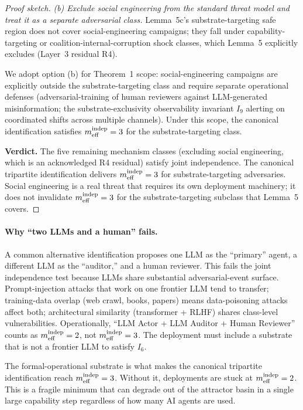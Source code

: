 \begin{proof}[Proof sketch]
\emph{(b) Exclude social engineering from the standard threat model
and treat it as a separate adversarial class.} Lemma~5c's
substrate-targeting safe region does not cover social-engineering
campaigns; they fall under capability-targeting or
coalition-internal-corruption shock classes, which Lemma~5
explicitly excludes (Layer~3 residual R4).

We adopt option (b) for Theorem~1 scope: social-engineering
campaigns are explicitly outside the substrate-targeting class and
require separate operational defenses (adversarial-training of
human reviewers against LLM-generated misinformation; the
substrate-exclusivity observability invariant $I_9$ alerting on
coordinated shifts across multiple channels). Under this scope,
the canonical identification satisfies $m_{\mathrm{eff}}^{\mathrm{indep}} = 3$ for the
substrate-targeting class.

\textbf{Verdict.} The five remaining mechanism classes (excluding
social engineering, which is an acknowledged R4 residual) satisfy
joint independence. The canonical tripartite identification
delivers $m_{\mathrm{eff}}^{\mathrm{indep}} = 3$ for substrate-targeting adversaries. Social
engineering is a real threat that requires its own deployment
machinery; it does not invalidate $m_{\mathrm{eff}}^{\mathrm{indep}} = 3$ for the
substrate-targeting subclass that Lemma~5 covers.
\end{proof}

\paragraph{Why ``two LLMs and a human'' fails.}
A common alternative identification proposes one LLM as the ``primary'' agent,
a different LLM as the ``auditor,'' and a human reviewer. This fails the joint
independence test because LLMs share substantial adversarial-event surface.
Prompt-injection attacks that work on one frontier LLM tend to transfer;
training-data overlap (web crawl, books, papers) means data-poisoning attacks
affect both; architectural similarity (transformer + RLHF) shares class-level
vulnerabilities. Operationally, ``LLM Actor + LLM Auditor + Human Reviewer''
counts as $m_{\mathrm{eff}}^{\mathrm{indep}} = 2$, not $m_{\mathrm{eff}}^{\mathrm{indep}} = 3$. The deployment must include a
substrate that is not a frontier LLM to satisfy $I_6$.

The formal-operational substrate is what makes the canonical tripartite
identification reach $m_{\mathrm{eff}}^{\mathrm{indep}} = 3$. Without it, deployments are stuck at
$m_{\mathrm{eff}}^{\mathrm{indep}} = 2$. This is a fragile minimum that can degrade out of the attractor
basin in a single large capability step regardless of how many AI agents are
used.

